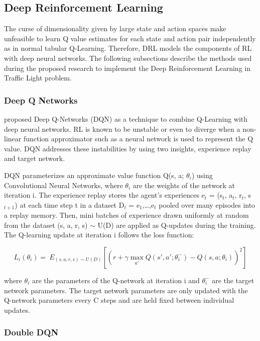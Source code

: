 \documentclass{llncs}
\begin{document}
\subsection{Deep Reinforcement Learning}

The curse of dimensionality given by large state and action spaces make unfeasible to learn Q value estimates for each state and action pair independently as in normal tabular Q-Learning. Therefore, DRL models the components of RL with deep neural networks. The following subsections describe the methods used during the proposed research to implement the Deep Reinforcement Learning in Traffic Light problem.

\subsubsection{Deep Q Networks}

\cite{Mnih2015} proposed Deep Q-Networks (DQN) as a technique to combine Q-Learning with deep neural networks. RL is known to be unstable or even to diverge when a non-linear function approximator such as a neural network is used to represent the Q value. DQN addresses these instabilities by using two insights, experience replay and target network.
	
	DQN parameterizes an approximate value function Q(s, a; $\theta_{i}$) using Convolutional Neural Networks, where $\theta_{i}$ are the weights of the network at iteration i. The experience replay stores the agent's experiences e$_{t}$ = (s$_{t}$, a$_{t}$, r$_{t}$, s$_{t+1}$) at each time step t in a dataset D$_{t}$ = {e$_{1}$,…,e$_{t}$} pooled over many episodes into a replay memory. Then, mini batches of experience drawn uniformly at random from the dataset (s, a, r, s) $\sim$ U(D) are applied as Q-updates during the training. The Q-learning update at iteration i follows the loss function:
	
\begin{equation}
L_{i}(\theta_{i}) = \ E_{(s,a,r,s) \sim U(D)} \left[ \left(r + \gamma \max_{a'}Q\left(s',a';\theta_{i}^{-}\right) - Q\left(s,a;\theta_{i}\right)\right)^{2} \right]
\end{equation}

where $\theta_{i}$ are the parameters of the Q-network at iteration i and $\theta_{i}^{-}$ are the target network parameters. The target network parameters are only updated with the Q-network parameters every C steps and are held fixed between individual updates.

\subsubsection{Double DQN}
\end{document}
